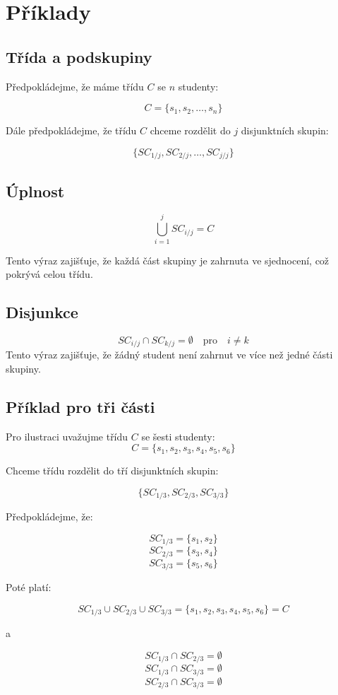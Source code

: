 \section{Příklady}

\subsection*{Třída a podskupiny}

Předpokládejme, že máme třídu \( C \) se \( n \) studenty:

\[
C = \{ s_1, s_2, \ldots, s_n \}
\]

Dále předpokládejme, že třídu \( C \) chceme rozdělit do \( j \) disjunktních skupin:

\[
\{ SC_{1/j}, SC_{2/j}, \ldots, SC_{j/j} \}
\]

\subsection*{Úplnost}

\[
\bigcup_{i=1}^{j} SC_{i/j} = C
\]

Tento výraz zajišťuje, že každá část skupiny je zahrnuta ve sjednocení, což pokrývá celou třídu.

\subsection*{Disjunkce}

\[
SC_{i/j} \cap SC_{k/j} = \emptyset \quad \text{pro} \quad i \neq k
\]
Tento výraz zajišťuje, že žádný student není zahrnut ve více než jedné části skupiny.

\begin{samepage}
\subsection*{Příklad pro tři části}

Pro ilustraci uvažujme třídu \( C \) se šesti studenty:
\nopagebreak
\[
C = \{ s_1, s_2, s_3, s_4, s_5, s_6 \}
\]

\noindent
Chceme třídu rozdělit do tří disjunktních skupin:

\nopagebreak

\[
\{ SC_{1/3}, SC_{2/3}, SC_{3/3} \}
\]

\noindent
Předpokládejme, že:

\nopagebreak

\[
SC_{1/3} = \{ s_1, s_2 \}
\]
\[
SC_{2/3} = \{ s_3, s_4 \}
\]
\[
SC_{3/3} = \{ s_5, s_6 \}
\]

\noindent
Poté platí:

\[
SC_{1/3} \cup SC_{2/3} \cup SC_{3/3} = \{ s_1, s_2, s_3, s_4, s_5, s_6 \} = C
\]

\noindent
a

\[
SC_{1/3} \cap SC_{2/3} = \emptyset
\]
\[
SC_{1/3} \cap SC_{3/3} = \emptyset
\]
\[
SC_{2/3} \cap SC_{3/3} = \emptyset
\]
\end{samepage}


